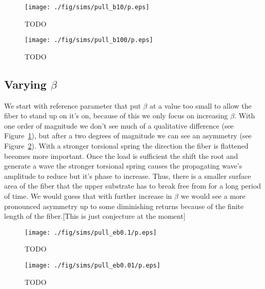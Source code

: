 	\begin{figure}
		\begin{center}
			\texttt{[image: ./fig/sims/pull\_b10/p.eps]}
		\end{center}		
		\caption{ TODO
		\label{fig:PullGrid:b10}}
	\end{figure}
	
	\begin{figure}
		\begin{center}
			\texttt{[image: ./fig/sims/pull\_b100/p.eps]}
		\end{center}		
		\caption{ TODO
		\label{fig:PullGrid:b100}}
	\end{figure}
	
\subsection{Varying $\beta$}

We start with reference parameter that put $\beta$ at a value too small to allow the fiber to stand up on it's on, because of this we only focus on increasing $\beta$. With one order of magnitude we don't see much of a qualitative difference (see Figure~\ref{fig:PullGrid:b10}), but after a two degrees of magnitude we can see an asymmetry (see Figure~\ref{fig:PullGrid:b100}). With a stronger torsional spring the direction the fiber is flattened becomes more important. Once the load is sufficient the shift the root and generate a wave the stronger torsional spring causes the propagating wave's amplitude to reduce but it's phase to increase. Thus, there is a smaller surface area of the fiber that the upper substrate has to break free from for a long period of time. We would guess that with further increase in $\beta$ we would see a more pronounced asymmetry up to some diminishing returns because of the finite length of the fiber.[This is just conjecture at the moment]

	\begin{figure}
		\begin{center}
			\texttt{[image: ./fig/sims/pull\_eb0.1/p.eps]}
		\end{center}		
		\caption{ TODO
		\label{fig:PullGrid:eb0.1}}
	\end{figure}

	\begin{figure}
		\begin{center}
			\texttt{[image: ./fig/sims/pull\_eb0.01/p.eps]}
		\end{center}		
		\caption{ TODO
		\label{fig:PullGrid:eb0.01}}
	\end{figure}
	

